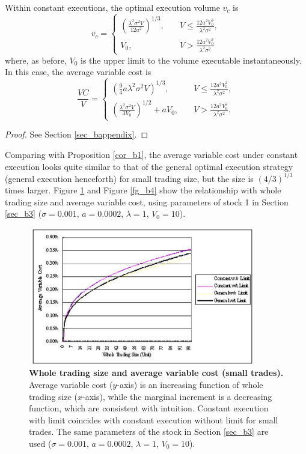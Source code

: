 \begin{proposition}\label{prop_b3}
 \quad Within constant executions, the optimal execution volume $v_c$ is
\[
  v_c = \left\{
  \begin{array}{ll}
   \left( \frac{\lambda^2 \sigma^2 V}{12a^2} \right)^{1/3},
     & \quad V \leq \frac{12 a^2 V_0^3}{\lambda^2 \sigma^2}, \\
   V_0, & \quad V > \frac{12 a^2 V_0^3}{\lambda^2 \sigma^2}
  \end{array}
  \right.
\]
where, as before, $V_0$ is the upper limit to the volume executable instantaneously.
 In this case, the average variable cost is
\[
  \frac{VC}{V} = \left\{
  \begin{array}{ll}
   \left( \frac{9}{4} a \lambda^2 \sigma^2 V \right)^{1/3},
    & \quad V \leq \frac{12a^2V_0^3}{\lambda^2\sigma^2}, \\
   \left( \frac{\lambda^2\sigma^2V}{3V_0} \right)^{1/2}+aV_0,
    & \quad V > \frac{12a^2V_0^3}{\lambda^2\sigma^2}.
  \end{array}
  \right.
\]
\end{proposition}

\begin{proof}
  See Section \ref{sec_bappendix}.
\end{proof}

\noindent Comparing with Proposition \ref{cor_b1}, the average variable cost under constant execution looks quite similar to that of the general optimal execution strategy (general execution henceforth) for small trading size, but the size is
$(4/3)^{1/3}$ times larger.  Figure \ref{fg_b3} and Figure \ref{fg_b4} show the relationship with whole trading size and average variable cost, using parameters of stock 1 in Section \ref{sec_b3} ($\sigma=0.001$, $a=0.0002$, $\lambda=1$, $V_0=10$).

\begin{figure}[htbp]
\begin{center}
 \includegraphics[width=10cm,height=6cm]{fg_b3n.png}
\end{center}
\caption[Whole trading size and average variable cost (small trades)]{{\bf Whole trading size and average variable
cost (small trades).}
 \quad Average variable cost ($y$-axis) is an increasing function of whole trading size ($x$-axis), while the marginal
increment is a decreasing function, which are consistent with intuition.
 Constant execution with limit coincides with constant execution without limit for small trades.
 The same parameters of the stock in Section \ref{sec_b3} are used ($\sigma=0.001$, $a=0.0002$, $\lambda=1$, $V_0=10$).}\label{fg_b3}
\end{figure}

